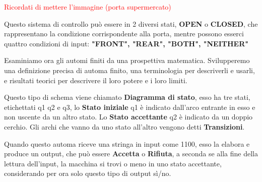\documentclass{article}
\begin{document}
\begin{center}
    \textcolor{red}{Ricordati di mettere l'immagine (porta supermercato)}
\end{center}

Questo sistema di controllo può essere in 2 diversi stati, \textbf{OPEN} o
\textbf{CLOSED}, che rappresentano la condizione corrispondente alla porta,
mentre possono esserci quattro condizioni di input: \textbf{"FRONT", "REAR",
"BOTH", "NEITHER"}

\begin{center}    
\end{center} 

Esaminiamo ora gli automi finiti da una prospettiva matematica. Svilupperemo una
definizione precisa di automa finito, una terminologia per descriverli e usarli,
e risultati teorici per descrivere il loro potere e i loro limiti.

\begin{center}
\end{center}

Questo tipo di schema viene chiamato \textbf{Diagramma di stato}, esso ha tre
stati, etichettati q1 q2 e q3, lo \textbf{Stato iniziale} q1 è indicato
dall'arco entrante in esso e non uscente da un altro stato. Lo \textbf{Stato
accettante} q2 è indicato da un doppio cerchio. Gli archi che vanno da uno stato
all'altro vengono detti \textbf{Transizioni}.

Quando questo automa riceve una stringa in input come 1100, esso la elabora e
produce un output, che può essere \textbf{Accetta} o \textbf{Rifiuta}, a seconda
se alla fine della lettura dell'input, la macchina si trovi o meno in uno stato
accettante, considerando per ora solo questo tipo di output sì/no.
\end{document}
